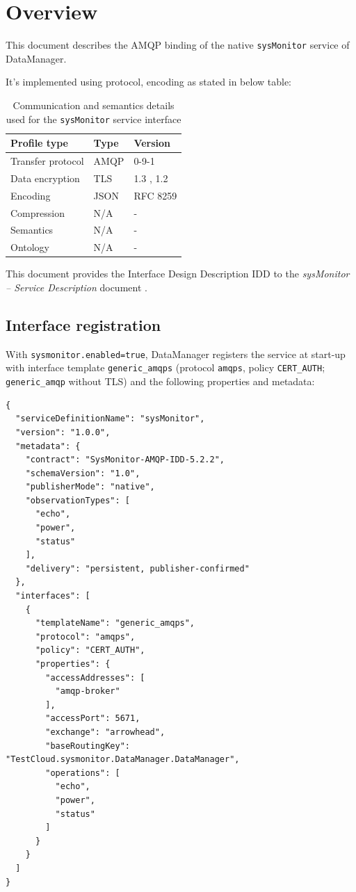 \documentclass[a4paper]{arrowhead}
\begin{document}
\section{Overview}
\label{sec:overview}

This document describes the AMQP binding of the native \texttt{sysMonitor} service of DataManager.

It's implemented using protocol, encoding as stated in below table:
\begin{table}[ht!]
  \centering
  \begin{tabular}{|l|l|l|}
    \hline
    \rowcolor{gray!33} Profile type & Type & Version \\ \hline
    Transfer protocol & AMQP & 0-9-1 \cite{amqp091} \\ \hline
    Data encryption & TLS & 1.3 \cite{rfc8446}, 1.2 \cite{rfc5246} \\ \hline
    Encoding & JSON & RFC 8259 \cite{rfc8259} \\ \hline
    Compression & N/A & - \\ \hline
    Semantics & N/A & - \\ \hline
    Ontology & N/A & - \\ \hline
  \end{tabular}
  \caption{Communication and semantics details used for the \texttt{sysMonitor} service interface}
  \label{tab:comunication_semantics_profile}
\end{table}

This document provides the Interface Design Description IDD to the \textit{sysMonitor -- Service Description} document \cite{dm-sysMonitor-sd}.

\subsection{Interface registration}

With \texttt{sysmonitor.enabled=true}, DataManager registers the service at start-up with interface template \texttt{generic\_\allowbreak{}amqps} (protocol \texttt{amqps}, policy \texttt{CERT\_\allowbreak{}AUTH}; \texttt{generic\_\allowbreak{}amqp} without TLS) and the following properties and metadata:

\begin{lstlisting}[caption={Registered service instance (TestCloud).}]
{
  "serviceDefinitionName": "sysMonitor",
  "version": "1.0.0",
  "metadata": {
    "contract": "SysMonitor-AMQP-IDD-5.2.2",
    "schemaVersion": "1.0",
    "publisherMode": "native",
    "observationTypes": [
      "echo",
      "power",
      "status"
    ],
    "delivery": "persistent, publisher-confirmed"
  },
  "interfaces": [
    {
      "templateName": "generic_amqps",
      "protocol": "amqps",
      "policy": "CERT_AUTH",
      "properties": {
        "accessAddresses": [
          "amqp-broker"
        ],
        "accessPort": 5671,
        "exchange": "arrowhead",
        "baseRoutingKey": "TestCloud.sysmonitor.DataManager.DataManager",
        "operations": [
          "echo",
          "power",
          "status"
        ]
      }
    }
  ]
}
\end{lstlisting}
\end{document}
